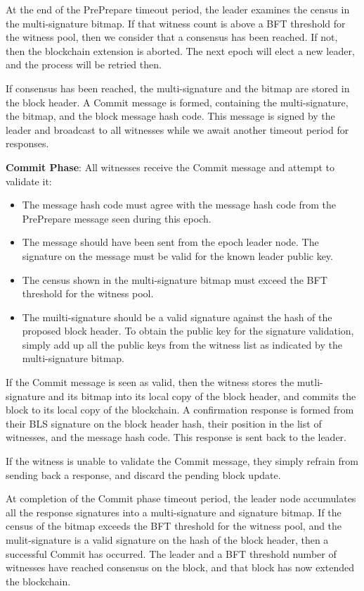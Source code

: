 \documentclass[a4paper, 10pt, conference]{ieeeconf}
\begin{document}
\begin{itemize}
{{At the end of the PrePrepare timeout period, the leader examines the census in the multi-signature bitmap. If that witness count is above a BFT threshold for the witness pool, then we consider that a consensus has been reached. If not, then the blockchain extension is aborted. The next epoch will elect a new leader, and the process will be retried then.

If consensus has been reached, the multi-signature and the bitmap are stored in the block header. A Commit message is formed, containing the multi-signature, the bitmap, and the block message hash code. This message is signed by the leader and broadcast to all witnesses while we await another timeout period for responses.}

\item{\textbf{Commit Phase}: All witnesses receive the Commit message and attempt to validate it:

\begin{itemize}
\item{The message hash code must agree with the message hash code from the PrePrepare message seen during this epoch.}
\item{The message should have been sent from the epoch leader node. The signature on the message must be valid for the known leader public key.}
\item{The census shown in the multi-signature bitmap must exceed the BFT threshold for the witness pool.}
\item{The muilti-signature should be a valid signature against the hash of the proposed block header. To obtain the public key for the signature validation, simply add up all the public keys from the witness list as indicated by the multi-signature bitmap.}
\end{itemize}

If the Commit message is seen as valid, then the witness stores the mutli-signature and its bitmap into its local copy of the block header, and commits the block to its local copy of the blockchain. A confirmation response is formed from their BLS signature on the block header hash, their position in the list of witnesses, and the message hash code. This response is sent back to the leader.

If the witness is unable to validate the Commit message, they simply refrain from sending back a response, and discard the pending block update.}

\item{At completion of the Commit phase timeout period, the leader node accumulates all the response signatures into a multi-signature and signature bitmap. If the census of the bitmap exceeds the BFT threshold for the witness pool, and the mulit-signature is a valid signature on the hash of the block header, then a successful Commit has occurred. The leader and a BFT threshold number of witnesses have reached consensus on the block, and that block has now extended the blockchain.}
}
\end{itemize}
\end{document}

